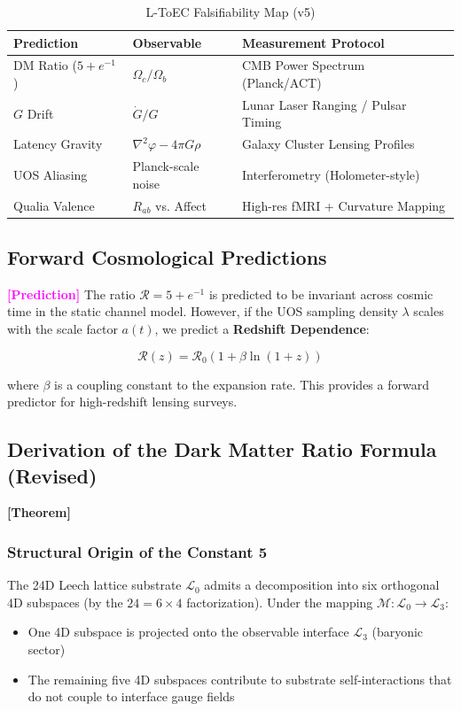 \documentclass[11pt,titlepage]{article}
\newcommand{\tagtheo}{\textcolor{green!60!black}{\textbf{[Theorem]}} }
\newcommand{\tagpred}{\textcolor{magenta}{\textbf{[Prediction]}} }
\begin{document}
\begin{table}[h!]
\centering
\begin{tabular}{@{}lll@{}}
\toprule
\textbf{Prediction} & \textbf{Observable} & \textbf{Measurement Protocol} \\ \midrule
DM Ratio ($5+e^{-1}$) & $\Omega_c / \Omega_b$ & CMB Power Spectrum (Planck/ACT) \\
$G$ Drift & $\dot{G}/G$ & Lunar Laser Ranging / Pulsar Timing \\
Latency Gravity & $\nabla^2 \varphi - 4\pi G \rho$ & Galaxy Cluster Lensing Profiles \\
UOS Aliasing & Planck-scale noise & Interferometry (Holometer-style) \\
Qualia Valence & $R_{ab}$ vs. Affect & High-res fMRI + Curvature Mapping \\ \bottomrule
\end{tabular}
\caption{L-ToEC Falsifiability Map (v5)}
\end{table}


\subsection{Forward Cosmological Predictions}
\tagpred The ratio $\mathcal{R} = 5 + e^{-1}$ is predicted to be invariant across cosmic time in the static channel model. However, if the UOS sampling density $\lambda$ scales with the scale factor $a(t)$, we predict a \textbf{Redshift Dependence}:

\begin{equation}
\mathcal{R}(z) = \mathcal{R}_0 (1 + \beta \ln(1+z))
\end{equation}

where $\beta$ is a coupling constant to the expansion rate. This provides a forward predictor for high-redshift lensing surveys.

\subsection{Derivation of the Dark Matter Ratio Formula (Revised)}
\tagtheo \label{deriv:dm-ratio-revised} 

\subsubsection{Structural Origin of the Constant 5}
The 24D Leech lattice substrate $\mathcal{L}_0$ admits a decomposition into six orthogonal 4D subspaces (by the $24 = 6 \times 4$ factorization). Under the mapping $\mathcal{M}: \mathcal{L}_0 \to \mathcal{L}_3$:
\begin{itemize}
    \item One 4D subspace is projected onto the observable interface $\mathcal{L}_3$ (baryonic sector)
    \item The remaining five 4D subspaces contribute to substrate self-interactions that do not couple to interface gauge fields
\end{itemize}
\end{document}
